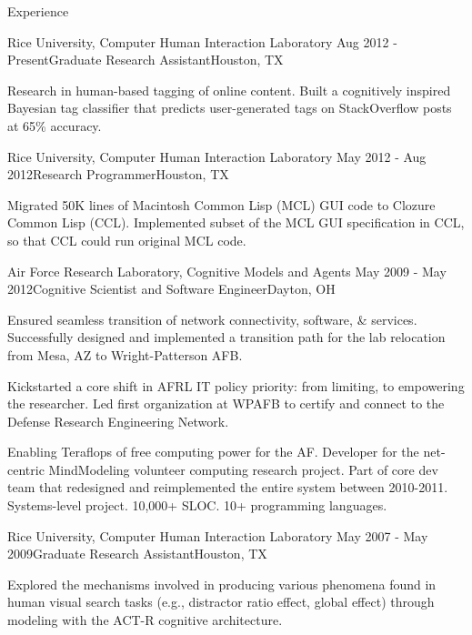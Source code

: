 
\begin{rSection}{Experience}

  \begin{rSubsection}{Rice University, Computer Human Interaction Laboratory}
    {Aug 2012 - Present}{Graduate Research Assistant}{Houston, TX}
  \item Research in human-based tagging of online content.
    Built a cognitively inspired Bayesian tag classifier that predicts user-generated tags on StackOverflow posts at 65\% accuracy.
  \end{rSubsection}

  \begin{rSubsection}{Rice University, Computer Human Interaction Laboratory}
    {May 2012 - Aug 2012}{Research Programmer}{Houston, TX}
  \item Migrated 50K lines of Macintosh Common Lisp (MCL) GUI code to Clozure Common Lisp (CCL).
    Implemented subset of the MCL GUI specification in CCL, so that CCL could run original MCL code.
  \end{rSubsection}

  \begin{rSubsection}{Air Force Research Laboratory, Cognitive Models and Agents}
    {May 2009 - May 2012}{Cognitive Scientist and Software Engineer}{Dayton, OH}
  \item
    Ensured seamless transition of network connectivity, software, \& services.
    Successfully designed and implemented a transition path for the lab relocation from Mesa, AZ to Wright-Patterson AFB. 
  \item 
    Kickstarted a core shift in AFRL IT policy priority: from limiting, to empowering the researcher.
    Led first organization at WPAFB to certify and connect to the Defense Research Engineering Network.
  \item 
    Enabling Teraflops of free computing power for the AF.
    Developer for the net-centric MindModeling volunteer computing research project.
    Part of core dev team that redesigned and reimplemented the entire system between 2010-2011.
    Systems-level project. 10,000+ SLOC. 10+ programming languages. 
  \end{rSubsection}

  \begin{rSubsection}{Rice University, Computer Human Interaction Laboratory}
    {May 2007 - May 2009}{Graduate Research Assistant}{Houston, TX}
  \item Explored the mechanisms involved in producing various phenomena found in human visual search tasks
    (e.g., distractor ratio effect, global effect) through modeling with the ACT-R cognitive architecture. 
  \end{rSubsection}


\end{rSection}
